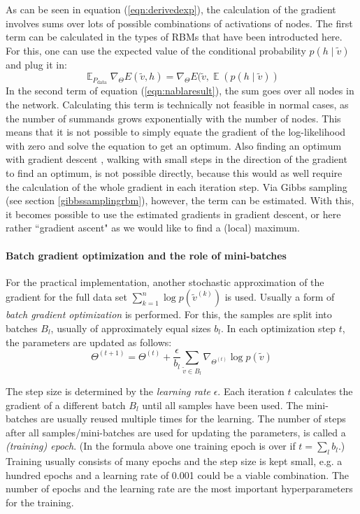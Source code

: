 \documentclass[12pt]{article}
\DeclareMathOperator{\EX}{\mathbb{E}}
\begin{document}
As can be seen in equation (\ref{eqn:derivedexp}), the calculation of the gradient involves sums over lots of possible combinations of activations of nodes.
The first term can be calculated in the types of RBMs that have been introducted here.
For this, one can use the expected value of the conditional probability $p(h\mid\widetilde{v})$ and plug it in:
\begin{equation}
\EX_{P_\text{data}} \nabla_{\!\Theta} E(\widetilde{v},h) =  \nabla_{\!\Theta} E(\widetilde{v}, \EX(p(h \mid \widetilde{v}))
\label{eqn:plugexpectedh}
\end{equation}
In the second term of equation (\ref{eqn:nablaresult}), the sum goes over all nodes in the network.
Calculating this term is technically not feasible in normal cases, as the number of summands grows exponentially with the number of nodes.
This means that it is not possible to simply equate the gradient of the log-likelihood with zero and solve the equation to get an optimum. Also finding an optimum with gradient descent \citep{gradientdescent}, walking with small steps in the direction of the gradient to find an optimum, is not possible directly, because this would as well require the calculation of the whole gradient in each iteration step.
Via Gibbs sampling (see section \ref{gibbssamplingrbm}), however, the term can be estimated. 
With this, it becomes possible to use the estimated gradients in gradient descent, or here rather ``gradient ascent" as we would like to find a (local) maximum.

\paragraph{Batch gradient optimization and the role of mini-batches}

For the practical implementation, another stochastic approximation of the gradient for the full data set $\sum_{k=1}^n \log p(\widetilde{v}^{(k)})$ is used.
Usually a form of {\em batch gradient optimization} \citep{bottou_optimization_2018} is performed.
For this, the samples are split into batches $B_l$, usually of approximately equal sizes $b_l$.
In each optimization step $t$, the parameters are updated as follows:
\[
\Theta^{(t+1)} = \Theta^{(t)} + \frac{\epsilon}{b_l} \sum_{\widetilde{v} \in B_l} \nabla_{\!\Theta^{(t)}} \log p(\widetilde{v})
\]

The step size is determined by the {\em learning rate} $\epsilon$.
Each iteration $t$ calculates the gradient of a different batch $B_l$ until all samples have been used.
The mini-batches are usually reused multiple times for the learning.
The number of steps after all samples/mini-batches are used for updating the parameters, is called a {\em (training) epoch}.
(In the formula above one training epoch is over if $t = \sum_l b_l$.)
Training usually consists of many epochs and the step size is kept small, e.g. a hundred epochs and a learning rate of 0.001 could be a viable combination.
The number of epochs and the learning rate are the most important hyperparameters for the training.
\end{document}
